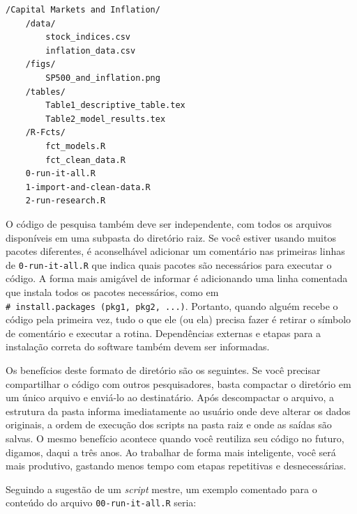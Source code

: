 \documentclass[
  11pt,
]{book}
\begin{document}
\begin{verbatim}
/Capital Markets and Inflation/
    /data/
        stock_indices.csv
        inflation_data.csv
    /figs/
        SP500_and_inflation.png
    /tables/
        Table1_descriptive_table.tex
        Table2_model_results.tex
    /R-Fcts/
        fct_models.R
        fct_clean_data.R
    0-run-it-all.R
    1-import-and-clean-data.R
    2-run-research.R
\end{verbatim}

O código de pesquisa também deve ser independente, com todos os arquivos disponíveis em uma subpasta do diretório raiz. Se você estiver usando muitos pacotes diferentes, é aconselhável adicionar um comentário nas primeiras linhas de \texttt{0-run-it-all.R} que indica quais pacotes são necessários para executar o código. A forma mais amigável de informar é adicionando uma linha comentada que instala todos os pacotes necessários, como em \texttt{\#\ install.packages\ (\textquotesingle{}pkg1\textquotesingle{},\ \textquotesingle{}pkg2\textquotesingle{},\ ...)}. Portanto, quando alguém recebe o código pela primeira vez, tudo o que ele (ou ela) precisa fazer é retirar o símbolo de comentário e executar a rotina. Dependências externas e etapas para a instalação correta do software também devem ser informadas.

Os benefícios deste formato de diretório são os seguintes. Se você precisar compartilhar o código com outros pesquisadores, basta compactar o diretório em um único arquivo e enviá-lo ao destinatário. Após descompactar o arquivo, a estrutura da pasta informa imediatamente ao usuário onde deve alterar os dados originais, a ordem de execução dos scripts na pasta raiz e onde as saídas são salvas. O mesmo benefício acontece quando você reutiliza seu código no futuro, digamos, daqui a três anos. Ao trabalhar de forma mais inteligente, você será mais produtivo, gastando menos tempo com etapas repetitivas e desnecessárias.

Seguindo a sugestão de um \emph{script} mestre, um exemplo comentado para o conteúdo do arquivo \texttt{00-run-it-all.R} seria:
\end{document}
